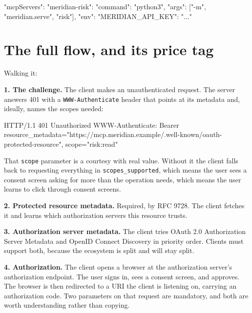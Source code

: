 \begin{py}
{
  "mcpServers": {
    "meridian-risk": {
      "command": "python3",
      "args": ["-m", "meridian.serve", "risk"],
      "env": { "MERIDIAN_API_KEY": "..." }
    }
  }
}
\end{py}

\section{The full flow, and its price tag}


Walking it:

\textbf{1. The challenge.} The client makes an unauthenticated request. The
server answers 401 with a \texttt{WWW-Authenticate} header that points at its
metadata and, ideally, names the scopes needed:

\begin{http}
HTTP/1.1 401 Unauthorized
WWW-Authenticate: Bearer resource_metadata="https://mcp.meridian.example/.well-known/oauth-protected-resource",
                         scope="risk:read"
\end{http}

That \texttt{scope} parameter is a courtesy with real value. Without it the
client falls back to requesting everything in \texttt{scopes\_supported}, which
means the user sees a consent screen asking for more than the operation needs,
which means the user learns to click through consent screens.

\textbf{2. Protected resource metadata.} Required, by RFC 9728. The client
fetches it and learns which authorization servers this resource trusts.

\textbf{3. Authorization server metadata.} The client tries OAuth 2.0
Authorization Server Metadata and OpenID Connect Discovery in priority order.
Clients must support both, because the ecosystem is split and will stay split.

\textbf{4. Authorization.} The client opens a browser at the authorization
server's authorization endpoint. The user signs in, sees a consent screen, and
approves. The browser is then redirected to a URI the client is listening on,
carrying an authorization code. Two parameters on that request are mandatory,
and both are worth understanding rather than copying.

